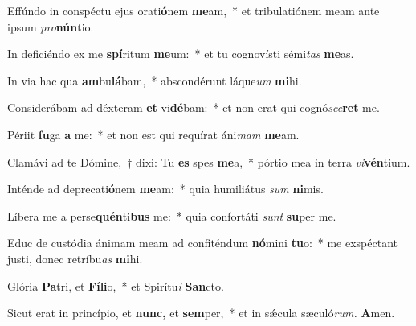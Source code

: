 \item Effúndo in conspéctu ejus orati\textbf{ó}nem \textbf{me}am,~* et tribulatiónem meam ante ipsum \textit{pro}\textbf{nún}tio.
\item In deficiéndo ex me \textbf{spí}ritum \textbf{me}um:~* et tu cognovísti sémi\teenyhspace\textit{tas} \textbf{me}as.
\item In via hac qua \textbf{am}bu\textbf{lá}bam,~* abscondérunt láque\tinyhspace\textit{um} \textbf{mi}hi.
\item Considerábam ad déxteram \textbf{et} vi\textbf{dé}bam:~* et non erat qui cognó\textit{sce}\textbf{ret} me.
\item Périit \textbf{fu}ga \textbf{a} me:~* et non est qui requírat áni\textit{mam} \textbf{me}am.
\item Clamávi ad te Dómine,~† dixi: Tu \textbf{es} spes \textbf{me}a,~* pórtio mea in terra \textit{vi}\textbf{vén}tium.
\item Inténde ad deprecati\textbf{ó}nem \textbf{me}am:~* quia humiliátus \textit{sum} \textbf{ni}mis.
\item Líbera me a perse\textbf{quén}ti\textbf{bus} me:~* quia confortáti \textit{sunt} \textbf{su}per me.
\item Educ de custódia ánimam meam ad confiténdum \textbf{nó}mini \textbf{tu}o:~* me exspéctant justi, donec retríbu\tinyhspace\textit{as} \textbf{mi}hi.
\item Glória \textbf{Pa}tri, et \textbf{Fí}\textbf{li}o,~* et Spirítu\textit{i} \textbf{San}cto.
\item Sicut erat in princípio, et \textbf{nunc,} et \textbf{sem}per,~* et in sǽcula sæculó\textit{rum.} \textbf{A}men.
